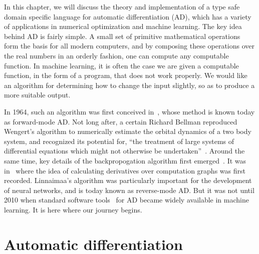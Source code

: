 \documentclass[12pt,initial,twoside,maitrise]{dms}
\numberwithin{equation}{section}
\numberwithin{table}{chapter}
\numberwithin{figure}{chapter}
\begin{document}
In this chapter, we will discuss the theory and implementation of a type safe domain specific language for automatic differentiation (AD), which has a variety of applications in numerical optimization and machine learning. The key idea behind AD is fairly simple. A small set of primitive mathematical operations form the basis for all modern computers, and by composing these operations over the real numbers in an orderly fashion, one can compute any computable function. In machine learning, it is often the case we are given a computable function, in the form of a program, that does not work properly. We would like an algorithm for determining how to change the input slightly, so as to produce a more suitable output.

In 1964, such an algorithm was first conceived in~\citet{wengert1964simple}, whose method is known today as forward-mode AD. Not long after, a certain Richard Bellman reproduced Wengert's algorithm to numerically estimate the orbital dynamics of a two body system, and recognized its potential for, ``the treatment of large systems of differential equations which might not otherwise be undertaken''~\citep{bellman1965wengert}. Around the same time, key details of the backpropogation algorithm first emerged~\citep{dreyfus1990artificial}. It was in~\citet{linnainmaa1970representation} where the idea of calculating derivatives over computation graphs was first recorded. Linnaimaa's algorithm was particularly important for the development of neural networks, and is today known as reverse-mode AD. But it was not until 2010 when standard software tools~\citep{bergstra2010theano, torch} for AD became widely available in machine learning. It is here where our journey begins.

\section{Automatic differentiation}\label{sec:automatic-differentiation}
\end{document}
